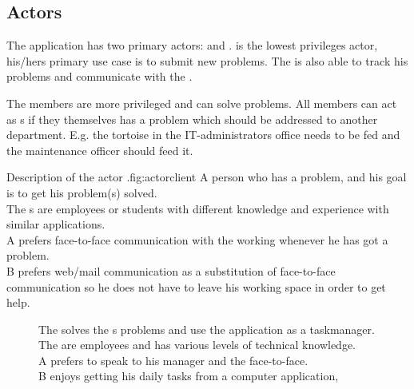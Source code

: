 \subsection{Actors}
\label{sec:actors}

The application has two primary actors:  \aclient{} and \astaff. \aclient[c] is the lowest privileges actor, his/hers primary use case is to submit new problems. The \aclient[] is also able to track his problems and communicate with the \astaff[]. 

The \astaff{} members are more privileged and can solve problems. 
All \astaff{} members can act as \aclient{}s if they themselves has a problem which should be addressed to another department. 
E.g. the tortoise in the IT-administrators office needs to be fed and the maintenance officer should feed it. 


\begin{sadlist}[h]{\Aclient}{Description of the actor \aclient.}{fig:actorclient}
 A person who has a problem, and his goal is to get his problem(s) solved. \\
 The \aclient{}s are employees or students with different knowledge and experience with similar applications. \\%
 \Aclient{} A prefers face-to-face communication with the working \astaff{} whenever he has got a problem.\\
\aclient[c] B prefers web/mail communication as a substitution of face-to-face communication so he does not have to leave his working space in order to get help. 
\end{sadlist} 

\begin{figure}[H]
\begin{sadlistar}{\Astaff}
 The \astaff{} solves the \aclient[]s problems and use the application as a taskmanager.  \\
 The \astaff[] are employees and has various levels of technical knowledge. \\
 \astaff[c] A prefers to speak to his manager and the \aclient[] face-to-face.\\
\astaff[c] B enjoys getting his daily tasks from a computer application, 
 \end{sadlistar}
 \caption{}
 \label{fig:actorstaff}
 \end{figure}


